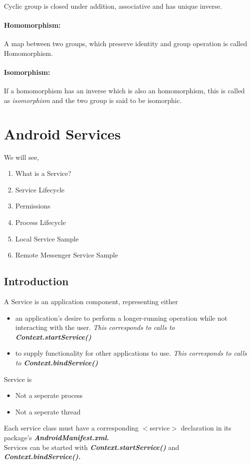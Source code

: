 \documentclass[12pt]{article}
\begin{document}
Cyclic group is closed under addition, associative and has unique inverse.

\paragraph{Homomorphism:} A map between two groups, which preserve identity and group operation is called Homomorphism.

\paragraph{Isomorphism:} If a homomorphism has an inverse which is also an homomorphism, this is called as \textit{isomorphism} and the two group is said to be isomorphic.
\pagebreak
\section{Android Services}
\label{Android Services}

We will see, 
\begin{enumerate}
\item What is a Service?
\item Service Lifecycle
\item Permissions
\item Process Lifecycle
\item Local Service Sample
\item Remote Messenger Service Sample
\end{enumerate}

\subsection{Introduction}
A Service is an application component, representing either 
\begin{itemize}
\item{an application's desire to perform a longer-running operation while not interacting with the user. \textit{This corresponds to calls to \textbf{Context.startService()}}}
\item{to supply functionality for other applications to use. \textit{This corresponds to calls to \textbf{Context.bindService()}}}
\end{itemize} 
Service is 
\begin{itemize}
\item Not a seperate process
\item Not a seperate thread
\end{itemize}
Each service class must have a corresponding $<$service$>$ declaration in its package's \textit{\textbf{AndroidManifest.xml.}} \\
Services can be started with \textbf{\textit{Context.startService()}} and \textbf{\textit{Context.bindService().}}\\
\end{document}
